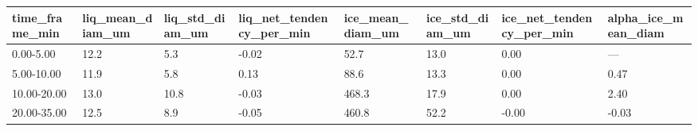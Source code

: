 \begin{tabular}{llllllll}
\toprule
time_frame_min & liq_mean_diam_um & liq_std_diam_um & liq_net_tendency_per_min & ice_mean_diam_um & ice_std_diam_um & ice_net_tendency_per_min & alpha_ice_mean_diam \\
\midrule
0.00-5.00 & 12.2 & 5.3 & -0.02 & 52.7 & 13.0 & 0.00 & — \\
5.00-10.00 & 11.9 & 5.8 & 0.13 & 88.6 & 13.3 & 0.00 & 0.47 \\
10.00-20.00 & 13.0 & 10.8 & -0.03 & 468.3 & 17.9 & 0.00 & 2.40 \\
20.00-35.00 & 12.5 & 8.9 & -0.05 & 460.8 & 52.2 & -0.00 & -0.03 \\
\bottomrule
\end{tabular}
